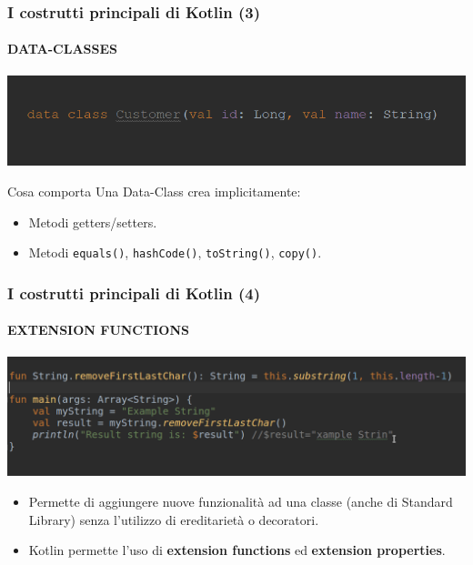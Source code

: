     \begin{frame}
      \frametitle{I costrutti principali di Kotlin (3)}
      \framesubtitle{DATA-CLASSES}
      \begin{center}
        \includegraphics[scale=0.5]{DataClass}
      \end{center}
      \begin{block}{Cosa comporta}
        Una Data-Class crea \alert{implicitamente}:
        \begin{itemize}
          \item Metodi getters/setters.
          \item Metodi \texttt{equals()}, \texttt{hashCode()}, \texttt{toString()}, \texttt{copy()}.
        \end{itemize}
      \end{block}
    \end{frame}

    \begin{frame}
      \frametitle{I costrutti principali di Kotlin (4)}
      \framesubtitle{EXTENSION FUNCTIONS}
      \begin{center}
        \includegraphics[scale=0.4]{ExtFun}
      \end{center}
      \begin{itemize}
        \item Permette di aggiungere nuove funzionalità ad una classe (anche di Standard Library) senza l'utilizzo di ereditarietà o decoratori.
        \item Kotlin permette l'uso di \textbf{extension functions} ed \textbf{extension properties}.
      \end{itemize}
    \end{frame}

